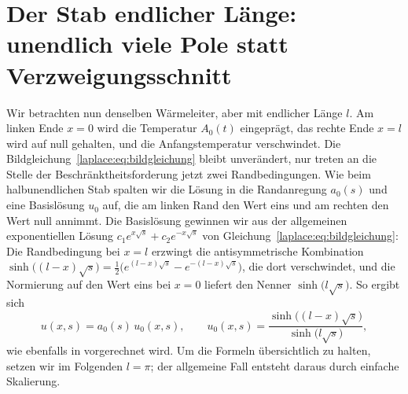 %
%
\section{Der Stab endlicher Länge: unendlich viele Pole statt
Verzweigungsschnitt}
\label{laplace:subsection:endlicher_stab}
%

Wir betrachten nun denselben Wärmeleiter, aber mit endlicher Länge $l$.
Am linken Ende $x = 0$ wird die Temperatur $A_0(t)$ eingeprägt, das rechte
Ende $x = l$ wird auf null gehalten, und die Anfangstemperatur verschwindet.
Die Bildgleichung~\eqref{laplace:eq:bildgleichung} bleibt unverändert, nur
treten an die Stelle der Beschränktheitsforderung jetzt zwei
Randbedingungen.
Wie beim halbunendlichen Stab spalten wir die Lösung in die Randanregung
$a_0(s)$ und eine Basislösung $u_0$ auf, die am linken Rand den Wert eins
und am rechten den Wert null annimmt.
Die Basislösung gewinnen wir aus der allgemeinen exponentiellen Lösung
$c_1 e^{x\sqrt{s}} + c_2 e^{-x\sqrt{s}}$ von
Gleichung~\eqref{laplace:eq:bildgleichung}:
Die Randbedingung bei $x = l$ erzwingt die antisymmetrische Kombination
$\sinh\bigl((l-x)\sqrt{s}\bigr)
= \tfrac{1}{2}\bigl(e^{(l-x)\sqrt{s}} - e^{-(l-x)\sqrt{s}}\bigr)$,
die dort verschwindet, und die Normierung auf den Wert eins bei $x = 0$
liefert den Nenner $\sinh\bigl(l\sqrt{s}\bigr)$.
So ergibt sich
\begin{equation}
    u(x,s)
    =
    a_0(s) \, u_0(x,s),
    \qquad
    u_0(x,s)
    =
    \frac{\sinh\bigl((l-x)\sqrt{s}\bigr)}{\sinh\bigl(l\sqrt{s}\bigr)},
    \label{laplace:eq:stab_bildfunktion}
\end{equation}
wie ebenfalls in \cite{laplace:doetsch1961} vorgerechnet wird.
Um die Formeln übersichtlich zu halten, setzen wir im Folgenden $l = \pi$;
der allgemeine Fall entsteht daraus durch einfache Skalierung.

